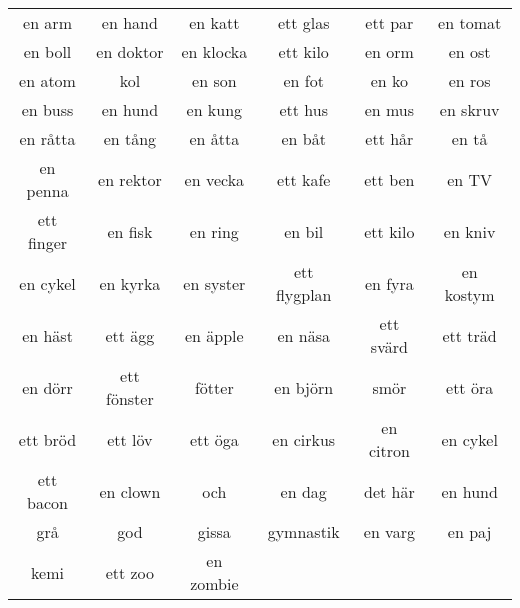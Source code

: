 \begin{center}
    \begin{tabular}{|c c c c c c|}
        \hline
        en arm & en hand & en katt & ett glas & ett par & en tomat \\
        en boll & en doktor & en klocka & ett kilo & en orm & en ost \\
        en atom & kol & en son & en fot & en ko & en ros \\
        en buss & en hund & en kung & ett hus & en mus & en skruv \\
        en råtta & en tång & en åtta & en båt & ett hår & en tå \\
        en penna & en rektor & en vecka & ett kafe & ett ben & en TV \\
        ett finger & en fisk & en ring & en bil & ett kilo &  en kniv \\
        en cykel  & en kyrka & en syster & ett flygplan & en fyra & en kostym \\
        en häst & ett ägg & en äpple & en näsa & ett svärd & ett träd \\
        en dörr & ett fönster & fötter & en björn & smör & ett öra \\
        ett bröd & ett löv & ett öga & en cirkus & en citron & en cykel \\
        ett bacon & en clown & och & en dag & det här & en hund \\
        grå & god & gissa & gymnastik & en varg & en paj \\
        kemi & ett zoo & en zombie &&& \\
        \hline
    \end{tabular}
\end{center}

